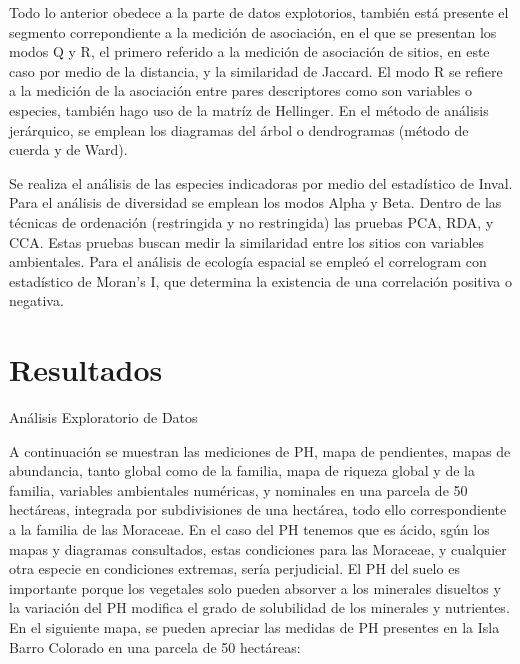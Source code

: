 \documentclass[11pt,]{article}
\begin{document}
Todo lo anterior obedece a la parte de datos explotorios, también está
presente el segmento correpondiente a la medición de asociación, en el
que se presentan los modos Q y R, el primero referido a la medición de
asociación de sitios, en este caso por medio de la distancia, y la
similaridad de Jaccard. El modo R se refiere a la medición de la
asociación entre pares descriptores como son variables o especies,
también hago uso de la matríz de Hellinger. En el método de análisis
jerárquico, se emplean los diagramas del árbol o dendrogramas (método de
cuerda y de Ward).

Se realiza el análisis de las especies indicadoras por medio del
estadístico de Inval. Para el análisis de diversidad se emplean los
modos Alpha y Beta. Dentro de las técnicas de ordenación (restringida y
no restringida) las pruebas PCA, RDA, y CCA. Estas pruebas buscan medir
la similaridad entre los sitios con variables ambientales. Para el
análisis de ecología espacial se empleó el correlogram con estadístico
de Moran's I, que determina la existencia de una correlación positiva o
negativa.

\section{Resultados}\label{resultados}

Análisis Exploratorio de Datos

A continuación se muestran las mediciones de PH, mapa de pendientes,
mapas de abundancia, tanto global como de la familia, mapa de riqueza
global y de la familia, variables ambientales numéricas, y nominales en
una parcela de 50 hectáreas, integrada por subdivisiones de una
hectárea, todo ello correspondiente a la familia de las Moraceae. En el
caso del PH tenemos que es ácido, sgún los mapas y diagramas
consultados, estas condiciones para las Moraceae, y cualquier otra
especie en condiciones extremas, sería perjudicial. El PH del suelo es
importante porque los vegetales solo pueden absorver a los minerales
disueltos y la variación del PH modifica el grado de solubilidad de los
minerales y nutrientes. En el siguiente mapa, se pueden apreciar las
medidas de PH presentes en la Isla Barro Colorado en una parcela de 50
hectáreas:
\end{document}
